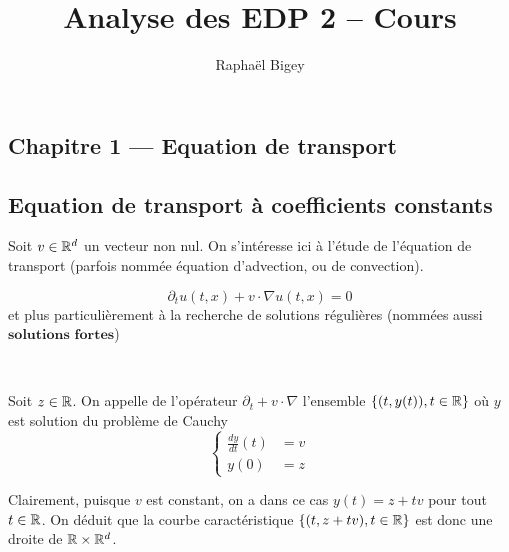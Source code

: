 \documentclass[french,a4paper,10pt]{article}
\title{\color{astral} \sffamily \bfseries Analyse des EDP 2 -- Cours}
\author{Raphaël Bigey}
\begin{document}
    \maketitle
    \tableofcontents

    \newpage
    \begin{center}
        \section*{Chapitre 1 --- Equation de transport}\label{sec:CH1}
    \end{center}
    
    \setcounter{section}{1}
    \setcounter{subsection}{0}
    
        \subsection{Equation de transport à coefficients constants}\label{subsec:1.1}
        
            Soit $v \in \mathbb{R}^d$ un vecteur non nul. On s'intéresse ici à l'étude de l'équation de transport (parfois nommée équation d'advection, ou de convection).
    
            \[
            \partial_t u(t,x) + v \cdot \nabla u(t,x) = 0
            \]
            et plus particulièrement à la recherche de solutions régulières (nommées aussi \(\textbf{solutions fortes}\))
    
            \begin{definition} \label{def:1.1.1}~
            
                Soit \(z \in \mathbb{R} \). On appelle  de l'opérateur \( \partial_t + v \cdot \nabla\) l'ensemble \( \{(t,y(t)), t \in \mathbb{R}\}\) où $y$ est solution du problème de Cauchy 
                \[
                \begin{cases}
                    \frac{dy}{dt}(t) & = v \\
                    y(0) & = z
                \end{cases}
                \]           
                
            \end{definition}
    
            \begin{remark}\label{rem:1.1.2}
                Clairement, puisque $v$ est constant, on a dans ce cas \(y(t) = z+tv\) pour tout $t \in \mathbb{R}$. On déduit que la courbe caractéristique $\{(t,z+tv),t\in\mathbb{R}\}$ est donc une droite de $\mathbb{R} \times \mathbb{R}^d$.
            \end{remark}
    
\end{document}
